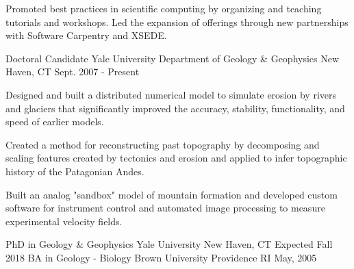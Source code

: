 \documentclass[11pt, letter]{awesome-cv}
\begin{document}
\begin{cventries}
{\begin{cvitems}
        \item {Promoted best practices in scientific computing by organizing and teaching tutorials and workshops. Led the expansion of offerings through new partnerships with Software Carpentry and XSEDE.}
      \end{cvitems}
    }
  \cventry
    {Doctoral Candidate}
    {Yale University Department of Geology \& Geophysics}
    {New Haven, CT}
    {Sept. 2007 - Present}
    {
      \begin{cvitems}
        \item {Designed and built a distributed numerical model to simulate erosion by rivers and glaciers that significantly improved the accuracy, stability, functionality, and speed of earlier models.}
        \item {Created a method for reconstructing past topography by decomposing and scaling features created by tectonics and erosion and applied to infer topographic history of the Patagonian Andes.}
        \item{Built an analog "sandbox" model of mountain formation and developed custom software for instrument control and automated image processing to measure experimental velocity fields.}
      \end{cvitems} 
    }
\end{cventries}

\begin{cventries}
  \cventry
    {PhD in Geology \& Geophysics}
    {Yale University}
    {New Haven, CT}
    {Expected Fall 2018}
    {}
  \cventry
    {BA in Geology - Biology}
    {Brown University}
    {Providence RI}
    {May, 2005}
    {}
\end{cventries}
\end{document}
